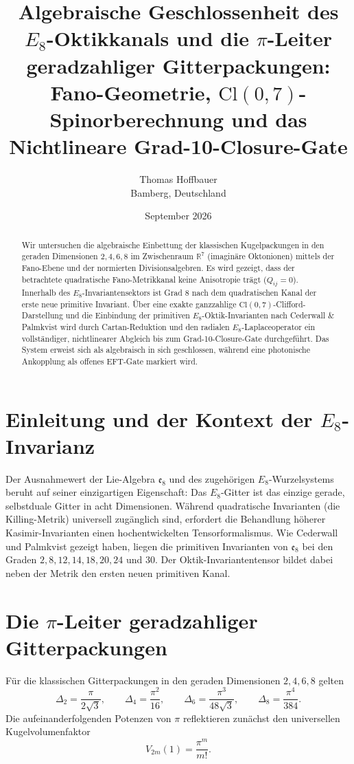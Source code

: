 \documentclass[11pt,a4paper]{article}
\title{\textbf{Algebraische Geschlossenheit des $E_8$-Oktikkanals und die $\pi$-Leiter geradzahliger Gitterpackungen:\\Fano-Geometrie, $\text{Cl}(0,7)$-Spinorberechnung und das Nichtlineare Grad-10-Closure-Gate}}
\author{Thomas Hoffbauer \\ \small Bamberg, Deutschland}
\date{September 2026}
\begin{document}
\maketitle

\begin{abstract}
Wir untersuchen die algebraische Einbettung der klassischen Kugelpackungen in den geraden Dimensionen $2, 4, 6, 8$ im Zwischenraum $\mathbb{R}^7$ (imaginäre Oktonionen) mittels der Fano-Ebene und der normierten Divisionsalgebren. Es wird gezeigt, dass der betrachtete quadratische Fano-Metrikkanal keine Anisotropie trägt ($Q_{ij} = 0$). Innerhalb des $E_8$-Invariantensektors ist Grad 8 nach dem quadratischen Kanal der erste neue primitive Invariant. Über eine exakte ganzzahlige $\text{Cl}(0,7)$-Clifford-Darstellung und die Einbindung der primitiven $E_8$-Oktik-Invarianten nach Cederwall \& Palmkvist wird durch Cartan-Reduktion und den radialen $E_8$-Laplaceoperator ein vollständiger, nichtlinearer Abgleich bis zum Grad-10-Closure-Gate durchgeführt. Das System erweist sich als algebraisch in sich geschlossen, während eine photonische Ankopplung als offenes EFT-Gate markiert wird.
\end{abstract}

\section{Einleitung und der Kontext der $E_8$-Invarianz}
Der Ausnahmewert der Lie-Algebra $\mathfrak{e}_8$ und des zugehörigen $E_8$-Wurzelsystems beruht auf seiner einzigartigen Eigenschaft: Das $E_8$-Gitter ist das einzige gerade, selbstduale Gitter in acht Dimensionen. Während quadratische Invarianten (die Killing-Metrik) universell zugänglich sind, erfordert die Behandlung höherer Kasimir-Invarianten einen hochentwickelten Tensorformalismus. Wie Cederwall und Palmkvist gezeigt haben, liegen die primitiven Invarianten von $\mathfrak{e}_8$ bei den Graden $2, 8, 12, 14, 18, 20, 24$ und $30$. Der Oktik-Invariantentensor bildet dabei neben der Metrik den ersten neuen primitiven Kanal.

\section{Die $\pi$-Leiter geradzahliger Gitterpackungen}
Für die klassischen Gitterpackungen in den geraden Dimensionen $2, 4, 6, 8$ gelten
\[
\Delta_2=\frac{\pi}{2\sqrt{3}},\qquad
\Delta_4=\frac{\pi^2}{16},\qquad
\Delta_6=\frac{\pi^3}{48\sqrt{3}},\qquad
\Delta_8=\frac{\pi^4}{384}.
\]
Die aufeinanderfolgenden Potenzen von $\pi$ reflektieren zunächst den universellen Kugelvolumenfaktor
\[
V_{2m}(1)=\frac{\pi^m}{m!}.
\]
\end{document}
